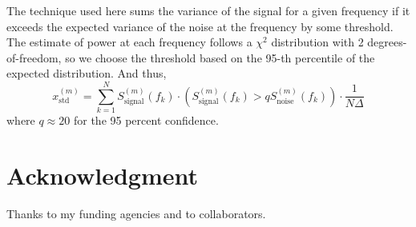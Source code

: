 \documentclass[10pt,journal]{IEEEtran}
\begin{document}
The technique used here sums the variance of the signal for a given frequency if it exceeds the expected variance of the noise at the frequency by some threshold. The estimate of power at each frequency follows a $\chi^2$ distribution with 2 degrees-of-freedom, so we choose the threshold based on the 95-th percentile of the expected distribution. And thus,
\begin{equation}
x^{(m)}_{\textrm{std}} = \sum_{k=1}^{N} S^{(m)}_{\textrm{signal}}(f_k) \cdot \left( S^{(m)}_{\textrm{signal}}(f_k) > q S_{\textrm{noise}}^{(m)}(f_k) \right) \cdot \frac{1}{N \Delta}
\end{equation}
where $q\approx 20$ for the 95 percent confidence.

\section*{Acknowledgment}
Thanks to my funding agencies and to collaborators. 



\end{document}
